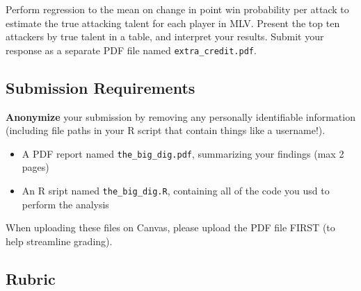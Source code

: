 \documentclass{article}
\begin{document}
        Perform regression to the mean on change in point win probability per attack to estimate the true attacking talent for each player in MLV. Present the top ten attackers by true talent in a table, and interpret your results. Submit your response as a separate PDF file named \texttt{extra\_credit.pdf}.

      \subsection*{\sc Submission Requirements}
      
        {\bf Anonymize} your submission by removing any personally identifiable information (including file paths in your R script that contain things like a username!).
        \begin{itemize}
          \item A PDF report named \texttt{the\_big\_dig.pdf}, summarizing your findings (max 2 pages)
          \item An R sript named \texttt{the\_big\_dig.R}, containing all of the code you usd to perform the analysis
        \end{itemize}
        When uploading these files on Canvas, please upload the PDF file FIRST (to help streamline grading).

      \subsection*{\sc Rubric}
\end{document}
